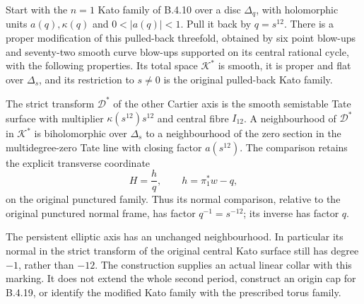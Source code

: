 \begin{proposition}
Start with the $n=1$ Kato family of B.4.10 over a disc
$\Delta_q$, with holomorphic units $a(q),\kappa(q)$ and
$0<|a(q)|<1$.  Pull it back by $q=s^{12}$.
There is a proper modification of this pulled-back threefold,
obtained by six point blow-ups and seventy-two smooth curve
blow-ups supported on its central rational cycle, with the
following properties.  Its total space $\mathcal K^*$ is smooth,
it is proper and flat over $\Delta_s$, and its restriction to
$s\ne0$ is the original pulled-back Kato family.

The strict transform $\mathcal D^*$ of the other Cartier axis
is the smooth semistable Tate surface with multiplier
$\kappa(s^{12})s^{12}$ and central fibre $I_{12}$.  A neighbourhood
of $\mathcal D^*$ in $\mathcal K^*$ is biholomorphic over
$\Delta_s$ to a neighbourhood of the zero section in the
multidegree-zero Tate line with closing factor $a(s^{12})$.
The comparison retains the explicit transverse coordinate
\[
 H=\frac{h}{q},\qquad h=\pi_1^*w-q,
 \tag{B.4.21.1}
\]
on the original punctured family.  Thus its normal comparison,
relative to the original punctured normal frame, has factor
$q^{-1}=s^{-12}$; its inverse has factor $q$.

The persistent elliptic axis has an unchanged neighbourhood.
In particular its normal in the strict transform of the original
central Kato surface still has degree $-1$, rather than $-12$.
The construction supplies an actual linear collar with this
marking.  It does not extend the whole second period, construct
an origin cap for B.4.19, or identify the modified Kato family
with the prescribed torus family.
\end{proposition}
